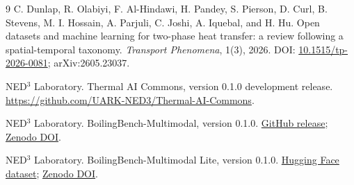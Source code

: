 \documentclass[11pt]{article}
\begin{document}

\begin{thebibliography}{9}
C. Dunlap, R. Olabiyi, F. Al-Hindawi, H. Pandey, S. Pierson, D. Curl, B. Stevens, M. I. Hossain, A. Parjuli, C. Joshi, A. Iquebal, and H. Hu.
\newblock Open datasets and machine learning for two-phase heat transfer: a review following a spatial-temporal taxonomy.
\newblock \emph{Transport Phenomena}, 1(3), 2026. DOI: \href{https://doi.org/10.1515/tp-2026-0081}{10.1515/tp-2026-0081}; arXiv:2605.23037.

NED$^3$ Laboratory.
\newblock Thermal AI Commons, version 0.1.0 development release.
\newblock \href{https://github.com/UARK-NED3/Thermal-AI-Commons}{https://github.com/UARK-NED3/Thermal-AI-Commons}.

NED$^3$ Laboratory.
\newblock BoilingBench-Multimodal, version 0.1.0.
\newblock \href{https://github.com/UARK-NED3/BoilingBench-Multimodal/releases/tag/v0.1.0}{GitHub release}; \href{https://doi.org/10.5281/zenodo.22131859}{Zenodo DOI}.

NED$^3$ Laboratory.
\newblock BoilingBench-Multimodal Lite, version 0.1.0.
\newblock \href{https://huggingface.co/datasets/hanhuark/BoilingBench-Multimodal}{Hugging Face dataset}; \href{https://doi.org/10.5281/zenodo.22131859}{Zenodo DOI}.
\end{thebibliography}
\end{document}
